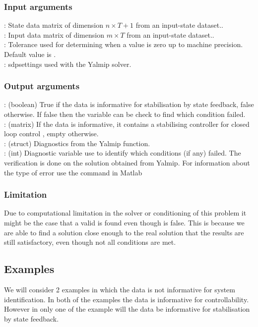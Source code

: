 \subsubsection*{Input arguments}
\textbf{}: State data matrix of dimension $n \times T+1$ from an input-state dataset..\\
\textbf{}: Input data matrix of dimension $m \times T$ from an input-state dataset..\\
\textbf{}: Tolerance used for determining when a value is zero up to machine precision. Default value is .\\
\textbf{}: sdpsettings used with the Yalmip solver.

\subsubsection*{Output arguments}
\textbf{}: (boolean) True if the data is informative for stabilisation by state feedback, false otherwise. If false then the  variable can be check to find which condition failed. \\
\textbf{}: (matrix) If the data is informative, it contains a stabilising controller  for closed loop control , empty otherwise.\\
\textbf{}: (struct) Diagnostics from the Yalmip  function. \\
\textbf{}: (int) Diagnostic variable use to identify which conditions (if any) failed. The verification is done on the solution obtained from Yalmip. For information about the type of error use the  command in Matlab

\subsubsection*{Limitation}
Due to computational limitation in the solver or conditioning of this problem it might be the case that a valid  is found even though  is false. This is because we are able to find a solution close enough to the real solution that the results are still satisfactory, even though not all conditions are met. 

\subsection{Examples} \label{ExampleOfSingleSystemHavingPropertyButNotInformative}
We will consider 2 examples in which the data is not informative for system identification. In both of the examples the data is informative for controllability. However in only one of the example will the data be informative for stabilisation by state feedback.

